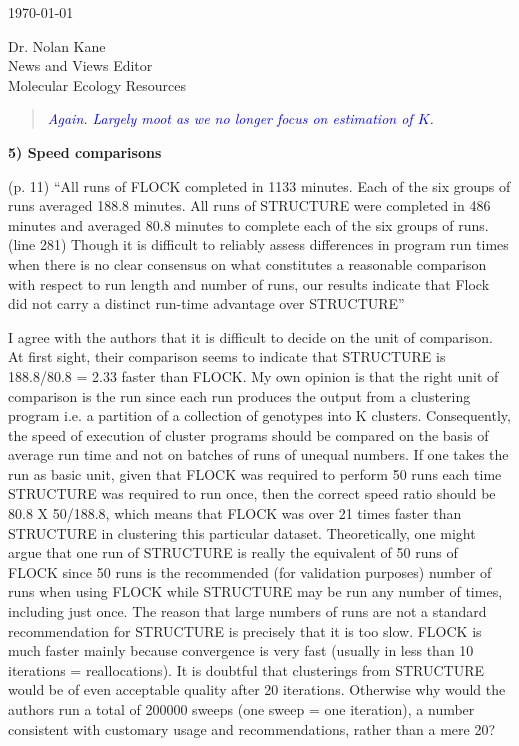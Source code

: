 \documentclass[11pt]{letter}
\newcommand{\reply}[1]{\begin{quotation}\small\sl\textcolor{blue}{#1}\end{quotation}}
\begin{document}
\begin{letter}{ \today 

Dr. Nolan Kane\\
News and Views Editor\\
Molecular Ecology Resources \\
}
\reply{Again.  Largely moot as we no longer focus on estimation of $K$.}

{\bf 5) Speed comparisons}

(p. 11) ``All runs of FLOCK completed in 1133 minutes. Each of the six groups of runs averaged 188.8 minutes. All runs of STRUCTURE were completed in 486 minutes and averaged 80.8 minutes to complete each of the six groups of runs.
(line 281) Though it is difficult to reliably assess differences in program run times when there is no clear consensus on what constitutes a reasonable comparison with respect to run length and number of runs, our results indicate that Flock did not carry a distinct run-time advantage over STRUCTURE''


I agree with the authors that it is difficult to decide on the unit of comparison.
At first sight, their comparison seems to indicate that STRUCTURE is 188.8/80.8 = 2.33 faster than FLOCK. My own opinion is that the right unit of comparison is the run since each run produces the output from a clustering program i.e. a partition of a collection of genotypes into K clusters. Consequently, the speed of execution of cluster programs should be compared on the basis of average run time and not on batches of runs of unequal numbers. If one takes the run as basic unit, given that FLOCK was required to perform 50 runs each time STRUCTURE was required to run once, then the correct speed ratio should be 80.8 X 50/188.8, which means that FLOCK was over 21 times faster than STRUCTURE in clustering this particular dataset. Theoretically, one might argue that one run of STRUCTURE is really the equivalent of 50 runs of FLOCK since 50 runs is the recommended (for validation purposes) number of runs when using FLOCK while STRUCTURE may be run any number of times, including just once. The reason that large numbers of runs are not a standard recommendation for STRUCTURE is precisely that it is too slow. FLOCK is much faster mainly because convergence is very fast (usually in less than 10 iterations = reallocations). It is doubtful that clusterings from STRUCTURE would be of even acceptable quality after 20 iterations. Otherwise why would the authors run a total of 200000 sweeps (one sweep = one iteration), a number consistent with customary usage and recommendations, rather than a mere 20?



\end{letter}
\end{document}
